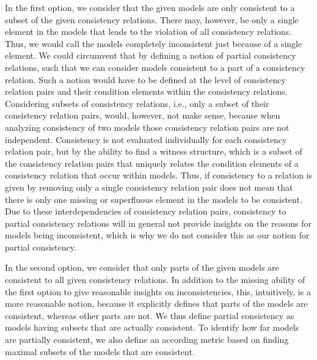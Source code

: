 In the first option, we consider that the given models are only consistent to a subset of the given consistency relations.
There may, however, be only a single element in the models that leads to the violation of all consistency relations.
Thus, we would call the models completely inconsistent just because of a single element.
We could circumvent that by defining a notion of partial consistency relations, such that we can consider models consistent to a part of a consistency relation.
Such a notion would have to be defined at the level of consistency relation pairs and their condition elements within the consistency relations.
Considering subsets of consistency relations, i.e., only a subset of their consistency relation pairs, would, however, not make sense, because when analyzing consistency of two models those consistency relation pairs are not independent.
Consistency is not evaluated individually for each consistency relation pair, but by the ability to find a witness structure, which is a subset of the consistency relation pairs that uniquely relates the condition elements of a consistency relation that occur within models.
Thus, if consistency to a relation is given by removing only a single consistency relation pair does not mean that there is only one missing or superfluous element in the models to be consistent.
Due to these interdependencies of consistency relation pairs, consistency to partial consistency relations will in general not provide insights on the reasons for models being inconsistent, which is why we do not consider this as our notion for partial consistency.

In the second option, we consider that only parts of the given models are consistent to all given consistency relations.
In addition to the missing ability of the first option to give reasonable insights on inconsistencies, this, intuitively, is a more reasonable notion, because it explicitly defines that parts of the models are consistent, whereas other parts are not.
We thus define partial consistency as models having subsets that are actually consistent.
To identify how far models are partially consistent, we also define an according metric based on finding maximal subsets of the models that are consistent.

